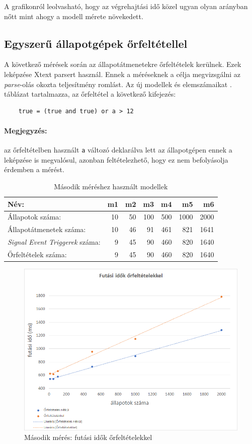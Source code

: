 A grafikonról leolvasható, hogy az végrehajtási idő közel ugyan olyan arányban nőtt mint ahogy a modell mérete növekedett.

\subsection{Egyszerű állapotgépek őrfeltétellel}

A következő mérések során az állapotátmenetekre őrfeltételek kerülnek. Ezek leképzése Xtext parsert használ. Ennek a méréseknek a célja megvizsgálni az \emph{parse}-olás okozta teljesítmény romlást. Az új modellek és elemszámaikat . táblázat tartalmazza, az őrfeltétel a következő kifejezés:
\begin{lstlisting}
	true = (true and true) or a > 12
\end{lstlisting}

\paragraph{Megjegyzés:} az őrfeltételben használt \verb+a+ változó deklarálva lett az állapotgépen ennek a leképzése is megvalósul, azonban feltételezhető, hogy ez nem befolyásolja érdemben a mérést.

\begin{table}[H]
	\footnotesize
	\centering
	\begin{tabular}{ l r r r r r r}
		Név: & m1 & m2 & m3 & m4 & m5 & m6 \\ \hline
		Állapotok száma:  & 10 & 50 & 100 & 500 & 1000 & 2000 \\
		Állapotátmenetek száma: & 10 & 46 & 91 & 461 & 821 & 1641 \\
		\emph{Signal Event Triggerek} száma: & 9 & 45 & 90 & 460 & 820 & 1640 \\
		Őrfeltételek száma: & 9 & 45 & 90 & 460 & 820 & 1640
	\end{tabular}
	\caption{Második méréshez használt modellek}
	\label{table:meres2}
\end{table}

\begin{figure}[H]
	\centering
	\includegraphics[keepaspectratio, width=150mm]{figures/meres2.png}
	\caption{Második mérés: futási idők őrfeltételekkel}
	\label{fig:meres2}
\end{figure}

